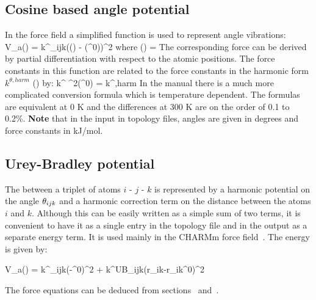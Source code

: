 \subsection{Cosine based angle potential}
\label{subsec:G96angle}
In the  force field a simplified function is used to represent angle
vibrations:
\beq
V_a(\tijk) = \half k^{\theta}_{ijk}\left(\cos(\tijk) - \cos(\tijk^0)\right)^2
\label{eq:G96angle}
\eeq
where 
\beq
\cos(\tijk) = 
\eeq
The corresponding force can be derived by partial differentiation with respect
to the atomic positions. The force constants in this function are related
to the force constants in the harmonic form $k^{\theta,harm}$
() by:
\beq
k^{\theta} \sin^2(\tijk^0) = k^{\theta,harm}
\eeq
In the  manual there is a much more complicated conversion formula
which is temperature dependent. The formulas are equivalent at 0 K
and the differences at 300 K are on the order of 0.1 to 0.2\%.
{\bf Note} that in the input in topology files, angles are given in degrees and
force constants in kJ/mol.

\subsection{Urey-Bradley potential}
\label{subsec:Urey-Bradley}
The  between a triplet
of atoms $i$ - $j$ - $k$ is represented by a harmonic potential on the
angle $\tijk$ and a harmonic correction term on the distance between
the atoms $i$ and $k$. Although this can be easily written as a simple
sum of two terms, it is convenient to have it as a single entry in the
topology file and in the output as a separate energy term. It is used mainly
in the CHARMm force field~\cite{BBrooks83}. The energy is given by:

\beq
V_a(\tijk) = \half k^{\theta}_{ijk}(\tijk-\tijk^0)^2 + \half k^{UB}_{ijk}(r_{ik}-r_{ik}^0)^2
\eeq

The force equations can be deduced from sections~
and~.


